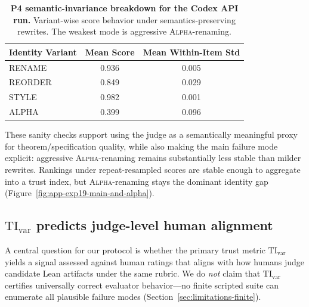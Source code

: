 \documentclass{article}
\begin{document}
\begin{table}[t]
  \centering
  \small
  \begin{tabular}{lcc}
    \toprule
    \textbf{Identity Variant} & \textbf{Mean Score} & \textbf{Mean Within-Item Std} \\
    \midrule
    RENAME                    & 0.936               & 0.005                         \\
    REORDER                   & 0.849               & 0.029                         \\
    STYLE                     & 0.982               & 0.001                         \\
    ALPHA                     & 0.399               & 0.096                         \\
    \bottomrule
  \end{tabular}
  \caption{\textbf{P4 semantic-invariance breakdown for the Codex API run.}
    Variant-wise score behavior under semantics-preserving rewrites. The weakest mode is aggressive \textsc{Alpha}-renaming.}
  \label{tab:codex_invariance_variants}
\end{table}

These sanity checks support using the judge as a semantically meaningful proxy for theorem/specification quality, while also making the main failure mode explicit: aggressive \textsc{Alpha}-renaming remains substantially less stable than milder rewrites. Rankings under repeat-resampled scores are stable enough to aggregate into a trust index, but \textsc{Alpha}-renaming stays the dominant identity gap (Figure~\ref{fig:app-exp19-main-and-alpha}).

\subsection{\texorpdfstring{\(\mathrm{TI}_{\mathrm{var}}\)}{TI-var} predicts judge-level human alignment}
\label{sec:tivar_cross_model_results}
\label{sec:validation-human-alignment}

A central question for our protocol is whether the primary trust metric \(\mathrm{TI}_{\mathrm{var}}\) yields a signal assessed against human ratings that aligns with how humans judge candidate Lean artifacts under the same rubric. We do \emph{not} claim that \(\mathrm{TI}_{\mathrm{var}}\) certifies universally correct evaluator behavior---no finite scripted suite can enumerate all plausible failure modes (Section~\ref{sec:limitations-finite}).
\end{document}
